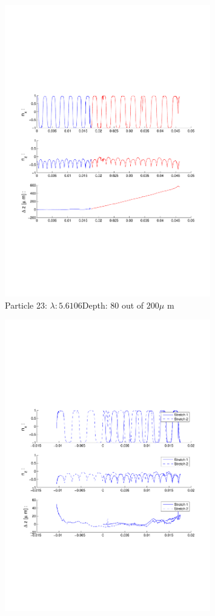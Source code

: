 \begin{figure}[H]
\centering
\includegraphics[width=0.8\textwidth]{Images/Particle 23/Particle23.pdf}
\caption{Particle 23: $ \lambda: 5.6106$Depth: 80 out of $200 \mu $ m}
\end{figure}

\begin{figure}[H]
\centering
\includegraphics[width=0.8\textwidth]{Images/Particle 23/Stretch1.pdf}
\end{figure}



